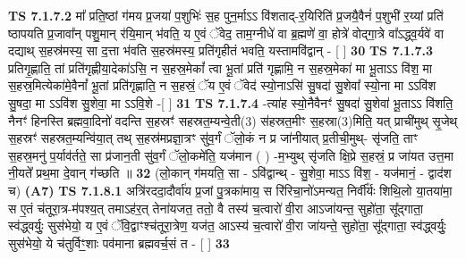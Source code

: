 \documentclass[17pt]{extarticle}
\begin{document}
                                \textbf{ TS 7.1.7.2} \newline
                  मा᳚ प्रति॒ष्ठां ग॑मय प्र॒जया॑ प॒शुभिः॑ स॒ह पुन॒र्माऽऽ वि॑शताद्-र॒यिरिति॑ प्र॒जयै॒वैनं॑ प॒शुभी॑ र॒य्यां प्रति॑ ष्ठापयति प्र॒जावा᳚न् पशु॒मान् र॑यि॒मान् भ॑वति॒ य ए॒वं ॅवेद॒ ताम॒ग्नीधे॑ वा ब्र॒ह्मणे॑ वा॒ होत्रे॑ वोद्गा॒त्रे वा᳚ऽद्ध्व॒र्यवे॑ वा दद्याथ् स॒हस्र॑मस्य॒ सा द॒त्ता भ॑वति स॒हस्र॑मस्य॒ प्रति॑गृहीतं भवति॒ यस्तामवि॑द्वान् - [  ] \textbf{  30} \newline
                  \newline
                                \textbf{ TS 7.1.7.3} \newline
                  प्रतिगृ॒ह्णाति॒ तां प्रति॑गृह्णीया॒देका॑ऽसि॒ न स॒हस्र॒मेकां᳚ त्वा भू॒तां प्रति॑ गृह्णामि॒ न स॒हस्र॒मेका॑ मा भू॒ताऽऽ वि॑श॒ मा स॒हस्र॒मित्येका॑मे॒वैनां᳚ भू॒तां प्रति॑गृह्णाति॒ न स॒हस्रं॒ ॅय ए॒वं ॅवेद॑ स्यो॒नाऽसि॑ सु॒षदा॑ सु॒शेवा᳚ स्यो॒ना मा ऽऽवि॑श सु॒षदा॒ मा ऽऽवि॑श सु॒शेवा॒ मा ऽऽवि॒शे -[  ] \textbf{  31} \newline
                  \newline
                                \textbf{ TS 7.1.7.4} \newline
                  -त्या॑ह स्यो॒नैवैनꣳ॑ सु॒षदा॑ सु॒शेवा॑ भू॒ताऽऽ वि॑शति॒ नैनꣳ॑ हिनस्ति ब्रह्मवा॒दिनो॑ वदन्ति स॒हस्रꣳ॑ सहस्रत॒म्यन्वे॒ती(3) स॑हस्रत॒मीꣳ स॒हस्रा(3)मिति॒ यत् प्राची॑मुथ् सृ॒जेथ् स॒हस्रꣳ॑ सहस्रत॒म्यन्वि॑या॒त् तथ् स॒हस्र॑मप्रज्ञा॒त्रꣳ सु॑व॒र्गं ॅलो॒कं न प्र जा॑नीयात् प्र॒तीची॒मुथ्- सृ॑जति॒ ताꣳ स॒हस्र॒मनु॑ प॒र्याव॑र्तते॒ सा प्र॑जान॒ती सु॑व॒र्गं ॅलो॒कमे॑ति॒ यज॑मान ( ) -म॒भ्युथ् सृ॑जति क्षि॒प्रे स॒हस्रं॒ प्र जा॑यत उत्त॒मा नी॒यते᳚ प्रथ॒मा दे॒वान् ग॑च्छति ॥ \textbf{  32} \newline
                  \newline
                      (लो॒कान् ग॑मयति॒ सा - ऽवि॑द्वान्थ् - सु॒शेवा॒ माऽऽ वि॑श॒ - यज॑मानं॒ - द्वाद॑श च)  \textbf{(A7)} \newline \newline
                                        \textbf{ TS 7.1.8.1} \newline
                  अत्रि॑रददा॒दौर्वा॑य प्र॒जां पु॒त्रका॑माय॒ स रि॑रिचा॒नो॑ऽमन्यत॒ निर्वी᳚र्यः शिथि॒लो या॒तया॑मा॒ स ए॒तं च॑तूरा॒त्र-म॑पश्य॒त् तमाऽह॑र॒त् तेना॑यजत॒ ततो॒ वै तस्य॑ च॒त्वारो॑ वी॒रा आऽजा॑यन्त॒ सुहो॑ता॒ सू᳚द्गाता॒ स्व॑द्ध्वर्युः॒ सुस॑भेयो॒ य ए॒वं ॅवि॒द्वाꣳश्च॑तूरा॒त्रेण॒ यज॑त॒ आऽस्य॑ च॒त्वारो॑ वी॒रा जा॑यन्ते॒ सुहो॑ता॒ सू᳚द्गाता॒ स्व॑द्ध्वर्युः॒ सुस॑भेयो॒ ये च॑तुर्विꣳ॒॒शाः पव॑माना ब्रह्मवर्च॒सं त - [  ] \textbf{  33} \newline
\end{document}
